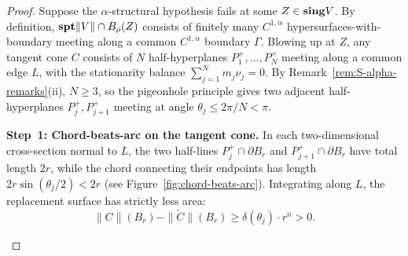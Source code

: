 \begin{proof}
Suppose the $\alpha$-structural hypothesis fails at some $Z \in \mathbf{sing} V$. By definition, $\mathbf{spt}\|V\| \cap B_\rho(Z)$ consists of finitely many $C^{1,\alpha}$ hypersurfaces-with-boundary meeting along a common $C^{1,\alpha}$ boundary $\Gamma$. Blowing up at $Z$, any tangent cone $C$ consists of $N$ half-hyperplanes $P_1^+, \ldots, P_N^+$ meeting along a common edge $L$, with the stationarity balance $\sum_{j=1}^N m_j \nu_j = 0$. By Remark~\ref{rem:S-alpha-remarks}(ii), $N \geq 3$, so the pigeonhole principle gives two adjacent half-hyperplanes $P_j^+, P_{j+1}^+$ meeting at angle $\theta_j \leq 2\pi/N < \pi$.

\medskip\noindent\textbf{Step~1: Chord-beats-arc on the tangent cone.}
In each two-dimensional cross-section normal to $L$, the two half-lines $P_j^+ \cap \partial B_r$ and $P_{j+1}^+ \cap \partial B_r$ have total length $2r$, while the chord connecting their endpoints has length $2r\sin(\theta_j/2) < 2r$ (see Figure~\ref{fig:chord-beats-arc}). Integrating along $L$, the replacement surface has strictly less area:
\[
    \|C\|(B_r) - \|\widetilde{C}\|(B_r) \geq \delta(\theta_j) \cdot r^n > 0.
\]

    \begin{figure}[ht]
        \centering
\end{figure}
\end{proof}
